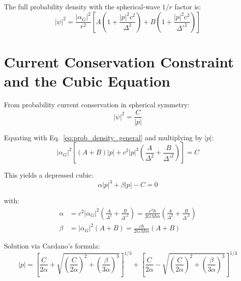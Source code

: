 \documentclass[11pt,a4paper]{article}
\theoremstyle{definition}
\theoremstyle{remark}
\begin{document}
	The full probability density with the spherical-wave $1/r$ factor is:
	\begin{equation}
		\boxed{
			|\psi|^2 = \frac{|\alpha_G|^2}{r^2}\!\left[A\!\left(1+\frac{|p|^2 c^2}{\Delta^2}\right)+B\!\left(1+\frac{|p|^2 c^2}{\Delta'^2}\right)\right]
		}
		\label{eq:prob_density_general}
	\end{equation}
	
	\section{Current Conservation Constraint and the Cubic Equation}
	
	From probability current conservation in spherical symmetry:
	\begin{equation}
		\boxed{|\psi|^2 = \frac{C}{|p|}}
	\end{equation}
	
	Equating with Eq.~\eqref{eq:prob_density_general} and multiplying by $|p|$:
	\begin{equation}
		|\alpha_G|^2\!\left[(A+B)|p| + c^2|p|^3\!\left(\frac{A}{\Delta^2}+\frac{B}{\Delta'^2}\right)\right] = C
	\end{equation}
	
	This yields a depressed cubic:
	\begin{equation}
		\boxed{\alpha|p|^3 + \beta|p| - C = 0}
		\label{eq:cubic_momentum}
	\end{equation}
	
	with:
	\begin{align}
		\alpha &= c^2|\alpha_G|^2\!\left(\frac{A}{\Delta^2}+\frac{B}{\Delta'^2}\right) = \frac{c^3\hbar}{2GMm}\!\left(\frac{A}{\Delta^2}+\frac{B}{\Delta'^2}\right) \label{eq:alpha_coeff}\\
		\beta  &= |\alpha_G|^2(A+B) = \frac{c\hbar}{2GMm}(A+B) \label{eq:beta_coeff}
	\end{align}
	
	Solution via Cardano's formula:
	\begin{equation}
		|p| = \left[\frac{C}{2\alpha}+\sqrt{\left(\frac{C}{2\alpha}\right)^2+\left(\frac{\beta}{3\alpha}\right)^3}\right]^{1/3}
		+ \left[\frac{C}{2\alpha}-\sqrt{\left(\frac{C}{2\alpha}\right)^2+\left(\frac{\beta}{3\alpha}\right)^3}\right]^{1/3}
		\label{eq:cardano_solution}
	\end{equation}
	
\end{document}
